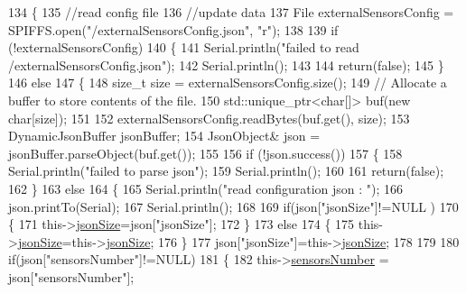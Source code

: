 \begin{DoxyCode}
134 \{
135     \textcolor{comment}{//read config file}
136     \textcolor{comment}{//update data}
137     File externalSensorsConfig = SPIFFS.open(\textcolor{stringliteral}{"/externalSensorsConfig.json"}, \textcolor{stringliteral}{"r"});
138 
139     \textcolor{keywordflow}{if} (!externalSensorsConfig) 
140     \{
141         Serial.println(\textcolor{stringliteral}{"failed to read /externalSensorsConfig.json"});
142         Serial.println();
143         
144         \textcolor{keywordflow}{return}(\textcolor{keyword}{false});
145     \}
146     \textcolor{keywordflow}{else}
147     \{
148         \textcolor{keywordtype}{size\_t} size = externalSensorsConfig.size();
149         \textcolor{comment}{// Allocate a buffer to store contents of the file.}
150         std::unique\_ptr<char[]> buf(\textcolor{keyword}{new} \textcolor{keywordtype}{char}[size]);
151 
152         externalSensorsConfig.readBytes(buf.get(), size);
153         DynamicJsonBuffer jsonBuffer;
154         JsonObject& json = jsonBuffer.parseObject(buf.get());
155 
156         \textcolor{keywordflow}{if} (!json.success()) 
157         \{
158             Serial.println(\textcolor{stringliteral}{"failed to parse json"});
159             Serial.println();
160 
161             \textcolor{keywordflow}{return}(\textcolor{keyword}{false});
162         \} 
163         \textcolor{keywordflow}{else}
164         \{   
165             Serial.println(\textcolor{stringliteral}{"read configuration json : "});
166             json.printTo(Serial);
167             Serial.println();
168 
169             \textcolor{keywordflow}{if}(json[\textcolor{stringliteral}{"jsonSize"}]!=NULL )
170             \{           
171                 this->\hyperlink{classExternalSensors_acacea86d74d967b57fcff282d26cff57}{jsonSize}=json[\textcolor{stringliteral}{"jsonSize"}];
172             \}
173             \textcolor{keywordflow}{else}
174             \{
175                 this->\hyperlink{classExternalSensors_acacea86d74d967b57fcff282d26cff57}{jsonSize}=this->\hyperlink{classExternalSensors_acacea86d74d967b57fcff282d26cff57}{jsonSize};
176             \}
177             json[\textcolor{stringliteral}{"jsonSize"}]=this->\hyperlink{classExternalSensors_acacea86d74d967b57fcff282d26cff57}{jsonSize};            
178 
179             
180             \textcolor{keywordflow}{if}(json[\textcolor{stringliteral}{"sensorsNumber"}]!=NULL)
181             \{
182                 this->\hyperlink{classExternalSensors_a58e4fbf9adeae787d92be5fa33043b5d}{sensorsNumber} = json[\textcolor{stringliteral}{"sensorsNumber"}];

\end{DoxyCode}
